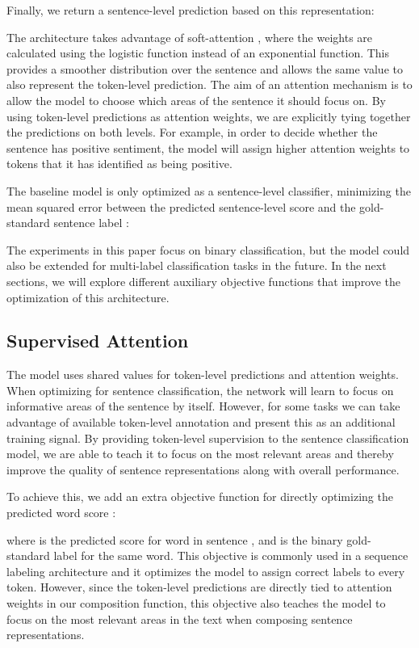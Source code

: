 \documentclass[letterpaper]{article} \usepackage{aaai19}  \usepackage{times}  \usepackage{helvet}  \usepackage{courier}  \usepackage{graphicx}
\renewcommand\cite{\citep}	\newcommand\newcite{\citet}
\begin{document}
Finally, we return a sentence-level prediction based on this representation:


The architecture takes advantage of soft-attention \cite{Shen2016}, where the weights are calculated using the logistic function instead of an exponential function. This provides a smoother distribution over the sentence and allows the same value to also represent the token-level prediction.
The aim of an attention mechanism is to allow the model to choose which areas of the sentence it should focus on. By using token-level predictions as attention weights, we are explicitly tying together the predictions on both levels. For example, in order to decide whether the sentence has positive sentiment, the model will assign higher attention weights to tokens that it has identified as being positive.


The baseline model is only optimized as a sentence-level classifier, minimizing the mean squared error between the predicted sentence-level score  and the gold-standard sentence label :


The experiments in this paper focus on binary classification, but the model could also be extended for multi-label classification tasks in the future.
In the next sections, we will explore different auxiliary objective functions that improve the optimization of this architecture.


\subsection{Supervised Attention}

The model uses shared values for token-level predictions and attention weights.
When optimizing for sentence classification, the network will learn to focus on informative areas of the sentence by itself.
However, for some tasks we can take advantage of available token-level annotation and present this as an additional training signal.
By providing token-level supervision to the sentence classification model, we are able to teach it to focus on the most relevant areas and thereby improve the quality of sentence representations along with overall performance.

To achieve this, we add an extra objective function for directly optimizing the predicted word score :

\noindent where  is the predicted score for word  in sentence , and  is the binary gold-standard label for the same word.
This objective is commonly used in a sequence labeling architecture and it optimizes the model to assign correct labels to every token.
However, since the token-level predictions are directly tied to attention weights in our composition function, this objective also teaches the model to focus on the most relevant areas in the text when composing sentence representations.
\end{document}
